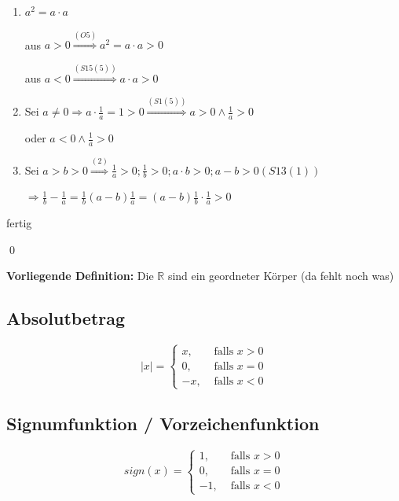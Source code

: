 \documentclass[fleqn]{scrbook}
\renewenvironment{proof}{{\bfseries Beweis }}{\qed}
\begin{document}
\begin{proof}

\begin{enumerate}
  \item $a^2=a \cdot a$
  
    aus $a>0 \stackrel{(O5)}{\Longrightarrow} a^2=a \cdot a>0$ 
    
    aus $a<0 \stackrel{(S15(5))}{\Longrightarrow} a \cdot a>0$
    
  \item Sei $a \neq 0 \Longrightarrow a \cdot \frac{1}{a} = 1 > 0 \stackrel{(S1(5))}{\Longrightarrow} a>0 \wedge \frac{1}{a}>0$
  
    oder $a<0 \wedge \frac{1}{a}>0$
    
  \item Sei $a>b>0 \stackrel{(2)}{\Longrightarrow} \frac{1}{a}>0;\frac{1}{b}>0;a \cdot b>0;a-b>0 (S13(1))$
  
  $\Longrightarrow \frac{1}{b} - \frac{1}{a} = \frac{1}{b}(a-b)\frac{1}{a}=(a-b)\frac{1}{b} \cdot \frac{1}{a}>0$
\end{enumerate}

fertig

\end{proof}

\textbf{Vorliegende Definition:} Die $\mathbb{R}$ sind ein geordneter Körper (da fehlt noch was)

\subsection{Absolutbetrag}

\[
  |x| = \left\{ 
    \begin{array}{rl}
       x, & \text{ falls } x>0 \\
       0, & \text{ falls } x=0\\
      -x, & \text{ falls } x<0
    \end{array}\right.
\]

\subsection{Signumfunktion / Vorzeichenfunktion}

\[
  sign(x) = \left\{ 
    \begin{array}{rl}
       1, & \text{ falls } x>0 \\
       0, & \text{ falls } x=0\\
      -1, & \text{ falls } x<0
    \end{array}\right.
\]
\end{document}
